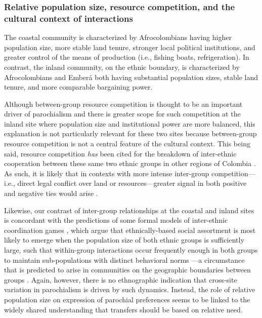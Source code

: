 \documentclass[bibauthoryear]{aa}
\begin{document}
\subsubsection{Relative population size, resource competition, and the cultural context of interactions}
\label{contextcc}
The coastal community is characterized by Afrocolombians having higher population size, more stable land tenure,  stronger local political institutions, and greater control of the means of production (i.e., fishing boats, refrigeration). In contrast, the inland community, on the ethnic boundary, is characterized by Afrocolombians and Ember\'a both having substantial population sizes, stable land tenure, and more comparable bargaining power. 

Although between-group resource competition is thought to be an important driver of parochialism  \citep{bellmoya} and there is greater scope for such competition at the inland site where population size and institutional power are more balanced, this explanation is not particularly relevant for these two sites because between-group resource competition is not a central feature of the cultural context. This being said, resource competition \textit{has} been cited for the breakdown of inter-ethnic cooperation between these same two ethnic groups in other regions of Colombia \citep[e.g.,][]{ng2000titling, davis2002indigenous, garcia2009diversos, velasco2011contested}. As such, it is likely that in contexts with more intense inter-group competition---i.e.,  direct legal conflict over land or resources---greater signal in both positive and negative ties would arise \citep[e.g., as predicted by models like][which investigate between group-conflict as a source of covariation in positive in-group ties and negative out-group ties]{choi2007coevolution}.

Likewise, our contrast of inter-group relationships at the coastal and inland sites is concordant with the predictions of some formal models of inter-ethnic coordination games \citep[e.g.,][]{mcelreath2003shared, advani2015melting}, which argue that ethnically-based social assortment is most likely to emerge when the population size of both ethnic groups is sufficiently large, such that within-group interactions occur frequently enough in both groups to maintain sub-populations with distinct behavioral norms \citep{bunce2017interethnic, bunce2018sustainability}---a circumstance that is predicted to arise in communities on the geographic boundaries between groups \citep{mcelreath2003shared}. Again, however, there is no ethnographic indication that cross-site variation in parochialism is driven by such dynamics. Instead, the role of relative population size on expression of parochial preferences seems to be linked to the widely shared understanding that transfers should be based on relative need.
\end{document}
